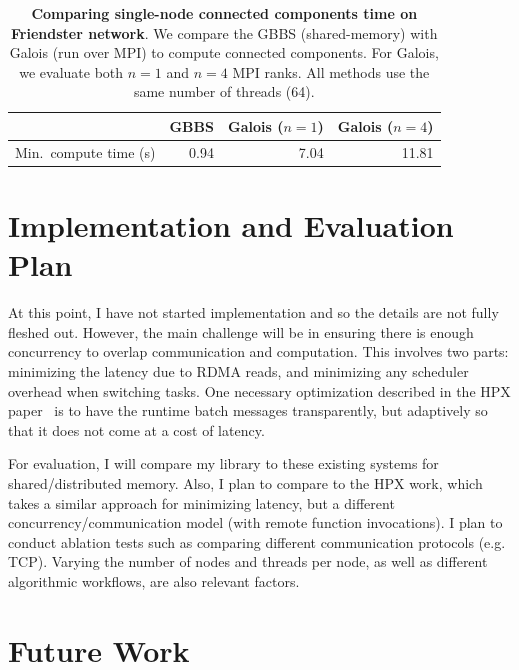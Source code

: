 \documentclass{article}
\begin{document}
\begin{table}[t]
    \centering
    \begin{tabular}{lrrr}
        \toprule
                               & GBBS & Galois ($n=1$) & Galois ($n=4$) \\
        \midrule
        Min.\ compute time (s) & 0.94 & 7.04           & 11.81          \\
        \bottomrule
    \end{tabular}
    \caption{
        \textbf{Comparing single-node connected components time on Friendster network}.
        We compare the GBBS (shared-memory) with Galois (run over MPI) to compute connected components.
        For Galois, we evaluate both $n=1$ and $n=4$ MPI ranks.
        All methods use the same number of threads (64).
    }
    \label{tab:cc-friendster}
\end{table}

\section{Implementation and Evaluation Plan}


At this point, I have not started implementation and so the details are not fully fleshed out.
However, the main challenge will be in ensuring there is enough concurrency to overlap communication and computation.
This involves two parts: minimizing the latency due to RDMA reads, and minimizing any scheduler overhead when switching tasks.
One necessary optimization described in the HPX paper~\cite{mohammadiporshokooh2026overcoming} is to have the runtime batch messages transparently, but adaptively so that it does not come at a cost of latency.

For evaluation, I will compare my library to these existing systems for shared/distributed memory.
Also, I plan to compare to the HPX work, which takes a similar approach for minimizing latency, but a different concurrency/communication model (with remote function invocations).
I plan to conduct ablation tests such as comparing different communication protocols (e.g. TCP).
Varying the number of nodes and threads per node, as well as different algorithmic workflows, are also relevant factors.

\section{Future Work}
\end{document}
